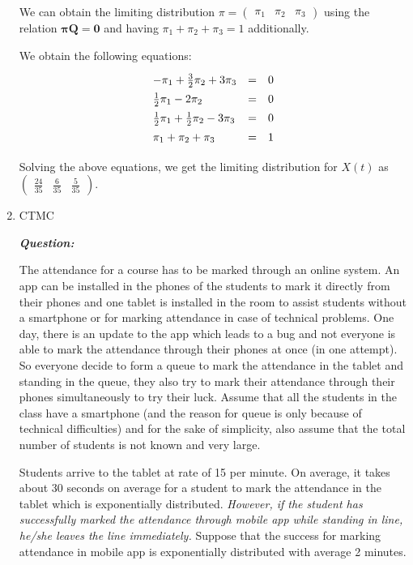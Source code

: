 \documentclass[12pt, oneside]{article}
\begin{document}
\begin{enumerate}
We can obtain the limiting distribution $\pi = \begin{pmatrix} \pi_1 & \pi_2 & \pi_3 \end{pmatrix}$ using the relation $\mathbf{\pi Q = 0}$ and having $\pi_1 + \pi_2 + \pi_3 = 1$ additionally. 

We obtain the following equations:
        \[\def\arraystretch{1.4}
            \begin{array}{lcl}
            -\pi_1 + \frac32\pi_2 + 3\pi_3 & = & 0 \\
            \frac12\pi_1 -2\pi_2 & = & 0 \\
            \frac12\pi_1 + \frac12\pi_2 -3 \pi_3 & = & 0 \\
            \pi_1 + \pi_2 + \pi_3 & = & 1 \\
            \end{array}
        \]

Solving the above equations, we get the limiting distribution for $X(t)$ as $\begin{pmatrix} \frac{24}{35} & \frac{6}{35} & \frac{5}{35} \end{pmatrix}$.



\newpage
\item CTMC

\textbf{\textit{Question:}}

The attendance for a course has to be marked through an online system. An app can be installed in the phones of the students to mark it directly from their phones and one tablet is installed in the room to assist students without a smartphone or for marking attendance in case of technical problems. One day, there is an update to the app which leads to a bug and not everyone is able to mark the attendance through their phones at once (in one attempt). So everyone decide to form a queue to mark the attendance in the tablet and standing in the queue, they also try to mark their attendance through their phones simultaneously to try their luck. Assume that all the students in the class have a smartphone (and the reason for queue is only because of technical difficulties) and for the sake of simplicity, also assume that the total number of students is not known and very large.

Students arrive to the tablet at rate of 15 per minute. On average, it takes about 30 seconds on average for a student to mark the attendance in the tablet which is exponentially distributed. \textit{However, if the student has successfully marked the attendance through mobile app while standing in line, he/she leaves the line immediately.} Suppose that the success for marking attendance in mobile app is exponentially distributed with average 2 minutes. 


\end{enumerate}
\end{document}
